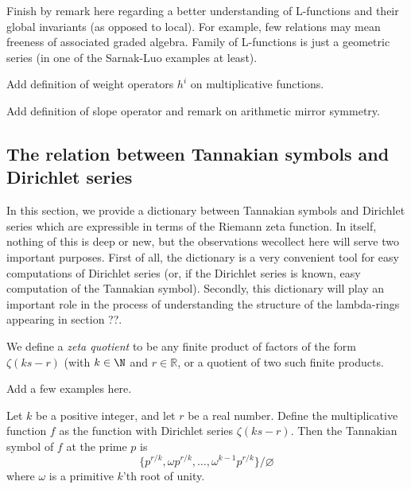 Finish by remark here regarding a better understanding of L-functions and their global invariants (as opposed to local). For example, few relations may mean freeness of associated graded algebra. Family of L-functions is just a geometric series (in one of the Sarnak-Luo examples at least).

Add definition of weight operators $h^i$ on multiplicative functions.

Add definition of slope operator and remark on arithmetic mirror symmetry.


\subsection{The relation between Tannakian symbols and Dirichlet series}


In this section, we provide a dictionary between Tannakian symbols and Dirichlet series which are expressible in terms of the Riemann zeta function. In itself, nothing of this is deep or new, but the observations wecollect here will serve two important purposes. First of all, the dictionary is a very convenient tool for easy computations of Dirichlet series (or, if the Dirichlet series is known, easy computation of the Tannakian symbol). Secondly, this dictionary will play an important role in the process of understanding the structure of the lambda-rings appearing in section ??. 

\begin{definition}
We define a \emph{zeta quotient} to be any finite product of factors of the form $\zeta(ks-r)$ (with $k \in \N$ and $r \in \mathbb{R}$, or a quotient of two such finite products. 
\end{definition}


\begin{example}
Add a few examples here.
\end{example}

\begin{proposition}
Let $k$ be a positive integer, and let $r$ be a real number. Define the multiplicative function $f$ as the function with Dirichlet series $\zeta(ks-r)$. Then the Tannakian symbol of $f$ at the prime $p$ is  
$$  \{  p^{r/k}, \omega p^{r/k} , \ldots , \omega^{k-1} p^{r/k} \}   / \varnothing $$
where $\omega$ is a primitive $k$'th root of unity.
\end{proposition} 

